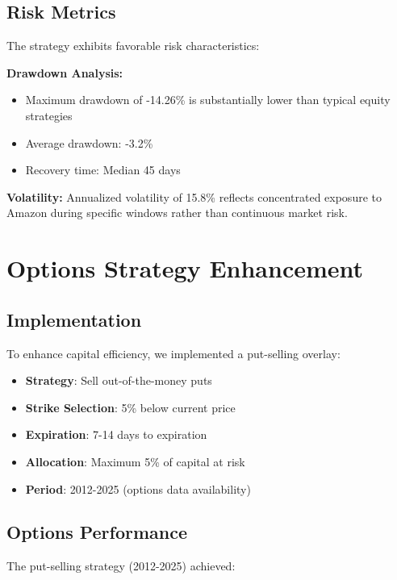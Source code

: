 \documentclass[twocolumn,ieee]{arithmaxresearch}
\begin{document}
\subsection{Risk Metrics}

The strategy exhibits favorable risk characteristics:

\textbf{Drawdown Analysis:}
\begin{itemize}
    \item Maximum drawdown of -14.26\% is substantially lower than typical equity strategies
    \item Average drawdown: -3.2\%
    \item Recovery time: Median 45 days
\end{itemize}

\textbf{Volatility:}
Annualized volatility of 15.8\% reflects concentrated exposure to Amazon during specific windows rather than continuous market risk.

\section{Options Strategy Enhancement}

\subsection{Implementation}

To enhance capital efficiency, we implemented a put-selling overlay:

\begin{itemize}
    \item \textbf{Strategy}: Sell out-of-the-money puts
    \item \textbf{Strike Selection}: 5\% below current price
    \item \textbf{Expiration}: 7-14 days to expiration
    \item \textbf{Allocation}: Maximum 5\% of capital at risk
    \item \textbf{Period}: 2012-2025 (options data availability)
\end{itemize}

\subsection{Options Performance}

The put-selling strategy (2012-2025) achieved:
\end{document}
